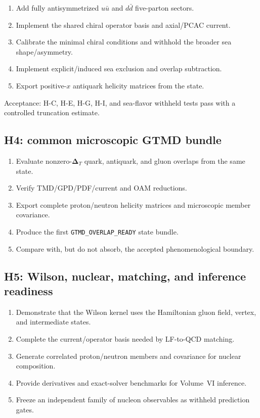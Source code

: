 \documentclass[11pt]{article}
\newcommand{\DT}{\bm{\Delta}_{T}}
\begin{document}
\begin{enumerate}
 \item Add fully antisymmetrized \(u\bar u\) and \(d\bar d\) five-parton
 sectors.
 \item Implement the shared chiral operator basis and axial/PCAC current.
 \item Calibrate the minimal chiral conditions and withhold the broader sea
 shape/asymmetry.
 \item Implement explicit/induced sea exclusion and overlap subtraction.
 \item Export positive-\(x\) antiquark helicity matrices from the state.
\end{enumerate}

Acceptance: H-C, H-E, H-G, H-I, and sea-flavor withheld tests pass with a
controlled truncation estimate.

\subsection{H4: common microscopic GTMD bundle}

\begin{enumerate}
 \item Evaluate nonzero-\(\DT\) quark, antiquark, and gluon overlaps from the
 same state.
 \item Verify TMD/GPD/PDF/current and OAM reductions.
 \item Export complete proton/neutron helicity matrices and microscopic member
 covariance.
 \item Produce the first \texttt{GTMD\_OVERLAP\_READY} state bundle.
 \item Compare with, but do not absorb, the accepted phenomenological boundary.
\end{enumerate}

\subsection{H5: Wilson, nuclear, matching, and inference readiness}

\begin{enumerate}
 \item Demonstrate that the Wilson kernel uses the Hamiltonian gluon field,
 vertex, and intermediate states.
 \item Complete the current/operator basis needed by LF-to-QCD matching.
 \item Generate correlated proton/neutron members and covariance for nuclear
 composition.
 \item Provide derivatives and exact-solver benchmarks for Volume~VI inference.
 \item Freeze an independent family of nucleon observables as withheld
 prediction gates.
\end{enumerate}
\end{document}
